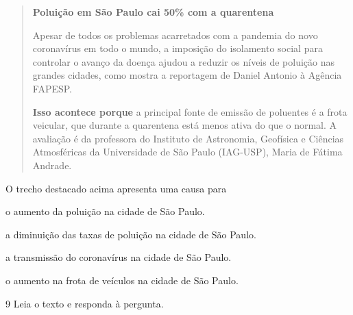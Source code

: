 \begin{quote}
\textbf{Poluição em São Paulo cai 50\% com a quarentena}

Apesar de todos os problemas acarretados com a pandemia do novo
coronavírus em todo o mundo, a imposição do isolamento social para
controlar o avanço da doença ajudou a reduzir os níveis de poluição nas
grandes cidades, como mostra a reportagem de Daniel Antonio à Agência
FAPESP.

\textbf{Isso acontece porque} a principal fonte de emissão de poluentes é a
frota veicular, que durante a quarentena está menos ativa do que o
normal. A avaliação é da professora do Instituto de Astronomia,
Geofísica e Ciências Atmosféricas da Universidade de São Paulo
(IAG-USP), Maria de Fátima Andrade.

\end{quote}

O trecho destacado acima apresenta uma causa para

\begin{escolha}
  \item o aumento da poluição na cidade de São Paulo.

  \item a diminuição das taxas de poluição na cidade de São Paulo.

  \item a transmissão do coronavírus na cidade de São Paulo.

  \item o aumento na frota de veículos na cidade de São Paulo.
\end{escolha}

\num{9} Leia o texto e responda à pergunta.

